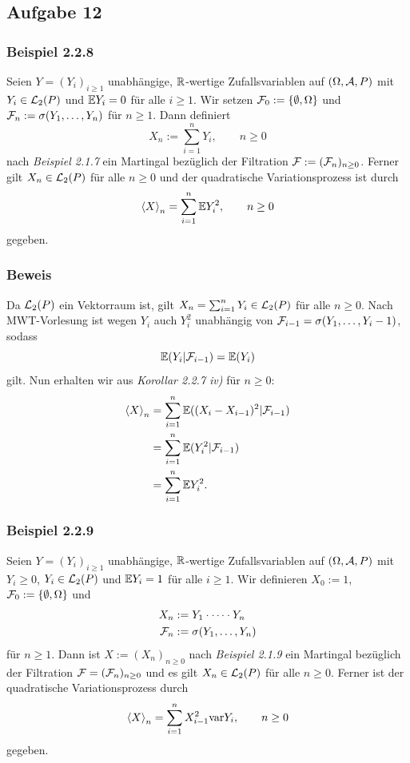 \documentclass[12pt]{scrartcl}
\date{\today}
\begin{document}
	
\subsection*{Aufgabe 12}
\subsubsection*{Beispiel 2.2.8}

Seien $Y=(Y_i)_{i\ge 1}$ unabhängige, $\mathbb{R}$-wertige Zufallsvariablen auf $(\Omega,\mathcal{A},P)$ mit $Y_i\in\mathcal{L}_{2}(P)$ und $\mathbb{E} Y_i=0$ für alle $i\ge 1$. Wir setzen $\mathcal{F}_0:=\{\emptyset,\Omega\}$ und $\mathcal{F}_n:=\sigma(Y_1,\dots,Y_n)$ für $n\ge 1$. Dann definiert
$$X_n:=\sum_{i=1}^n Y_i,\qquad n\ge 0$$
nach \textit{Beispiel 2.1.7} ein Martingal bezüglich der Filtration $\mathcal{F}:=(\mathcal{F}_n)_{n\ge 0}$.
Ferner gilt $X_n\in \mathcal{L}_2(P)$ für alle $n\ge 0$ und der quadratische Variationsprozess ist durch
$$\left<X\right>_n=\sum_{i=1}^n \mathbb{E} Y_i^2,\qquad n\ge 0$$
gegeben.

\subsubsection*{Beweis}
\einruecken

Da $\mathcal{L}_2(P)$ ein Vektorraum ist, gilt $X_n=\sum_{i=1}^n Y_i\in\mathcal{L}_2(P)$ für alle $n\ge 0$. Nach MWT-Vorlesung ist wegen $Y_i$ auch $Y_i^2$ unabhängig von $\mathcal{F}_{i-1}=\sigma(Y_1,\dots,Y_i-1)$, sodass
$$\mathbb{E}(Y_i|\mathcal{F}_{i-1})=\mathbb{E}(Y_i)$$
gilt. Nun erhalten wir aus \textit{Korollar 2.2.7 iv)} für $n\ge 0$:
\begin{align*}
\left<X\right>_n
&= \sum_{i=1}^n\mathbb{E}((X_i-X_{i-1})^2|\mathcal{F}_{i-1}) \\
&= \sum_{i=1}^n\mathbb{E}(Y_i^2|\mathcal{F}_{i-1}) \\
&= \sum_{i=1}^n\mathbb{E} Y_i^2.
\end{align*}

\ausruecken

\subsubsection*{Beispiel 2.2.9}

Seien $Y=(Y_i)_{i\ge 1}$ unabhängige, $\mathbb{R}$-wertige Zufallsvariablen auf $(\Omega,\mathcal{A},P)$ mit $Y_i \ge 0$, $Y_i\in\mathcal{L}_{2}(P)$ und $\mathbb{E} Y_i=1$ für alle $i\ge 1$. Wir definieren $X_0:=1$, $\mathcal{F}_0:=\{\emptyset,\Omega\}$ und
\begin{align*}
X_n &:= Y_1\cdot\dots\cdot Y_n \\
\mathcal{F}_n &:= \sigma(Y_1,\dots,Y_n)
\end{align*}
für $n\ge 1$. Dann ist $X:=(X_n)_{n\ge 0}$ nach \textit{Beispiel 2.1.9} ein Martingal bezüglich der Filtration $\mathcal{F}=(\mathcal{F}_n)_{n\ge 0}$ und es gilt $X_n\in\mathcal{L}_2(P)$ für alle $n\ge0$. Ferner ist der quadratische Variationsprozess durch
$$\left<X\right>_n=\sum_{i=1}^n X_{i-1}^2\text{var} Y_i,\qquad n\ge 0$$
gegeben.
\end{document}
